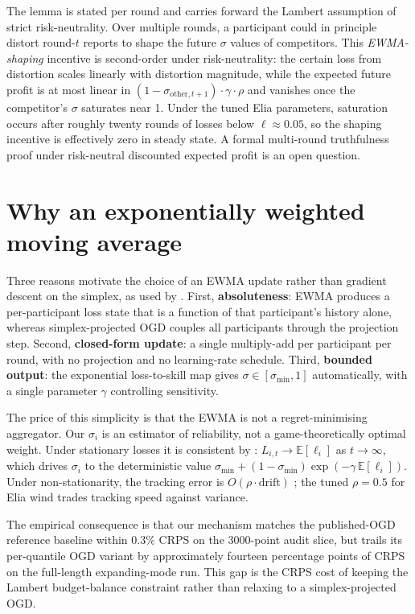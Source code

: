 \documentclass[
  11pt,
  a4paper,
  oneside]{report}
\begin{document}
The lemma is stated per round and carries forward the Lambert assumption
of strict risk-neutrality. Over multiple rounds, a participant could in
principle distort round-\(t\) reports to shape the future \(\sigma\)
values of competitors. This \emph{EWMA-shaping} incentive is
second-order under risk-neutrality: the certain loss from distortion
scales linearly with distortion magnitude, while the expected future
profit is at most linear in
\((1 - \sigma_{\text{other},t+1}) \cdot \gamma \cdot \rho\) and vanishes
once the competitor's \(\sigma\) saturates near 1. Under the tuned Elia
parameters, saturation occurs after roughly twenty rounds of losses
below \(\ell \approx 0.05\), so the shaping incentive is effectively
zero in steady state. A formal multi-round truthfulness proof under
risk-neutral discounted expected profit is an open question.

\section{Why an exponentially weighted moving
average}\label{why-an-exponentially-weighted-moving-average}

Three reasons motivate the choice of an EWMA update rather than gradient
descent on the simplex, as used by \citet{vitali2025intermittent}.
First, \textbf{absoluteness}: EWMA produces a per-participant loss state
that is a function of that participant's history alone, whereas
simplex-projected OGD couples all participants through the projection
step. Second, \textbf{closed-form update}: a single multiply-add per
participant per round, with no projection and no learning-rate schedule.
Third, \textbf{bounded output}: the exponential loss-to-skill map gives
\(\sigma \in [\sigma_{\min}, 1]\) automatically, with a single parameter
\(\gamma\) controlling sensitivity.

The price of this simplicity is that the EWMA is not a regret-minimising
aggregator. Our \(\sigma_i\) is an estimator of reliability, not a
game-theoretically optimal weight. Under stationary losses it is
consistent by \citet{robbins1951stochastic}:
\(L_{i, t} \to \mathbb{E}[\ell_i]\) as \(t \to \infty\), which drives
\(\sigma_i\) to the deterministic value
\(\sigma_{\min} + (1 - \sigma_{\min}) \exp(-\gamma\, \mathbb{E}[\ell_i])\).
Under non-stationarity, the tracking error is
\(O(\rho \cdot \mathrm{drift})\) \citep{benveniste1990adaptive}; the
tuned \(\rho = 0.5\) for Elia wind trades tracking speed against
variance.

The empirical consequence is that our mechanism matches the
published-OGD reference baseline within \(0.3\%\) CRPS on the 3000-point
audit slice, but trails its per-quantile OGD variant by approximately
fourteen percentage points of CRPS on the full-length expanding-mode run.
This gap is the CRPS cost of keeping the Lambert budget-balance
constraint rather than relaxing to a simplex-projected OGD.
\end{document}
